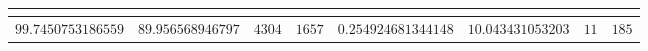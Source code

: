 \begin{table}[!tbp]
\begin{center}
\begin{tabular}{rrrrrrrr}
\hline\hline
\multicolumn{1}{c}{}&\multicolumn{1}{c}{}&\multicolumn{1}{c}{}&\multicolumn{1}{c}{}&\multicolumn{1}{c}{}&\multicolumn{1}{c}{}&\multicolumn{1}{c}{}&\multicolumn{1}{c}{}\tabularnewline
\hline
$99.7450753186559$&$89.956568946797$&$4304$&$1657$&$0.254924681344148$&$10.043431053203$&$11$&$185$\tabularnewline
\hline
\end{tabular}\end{center}
\end{table}
